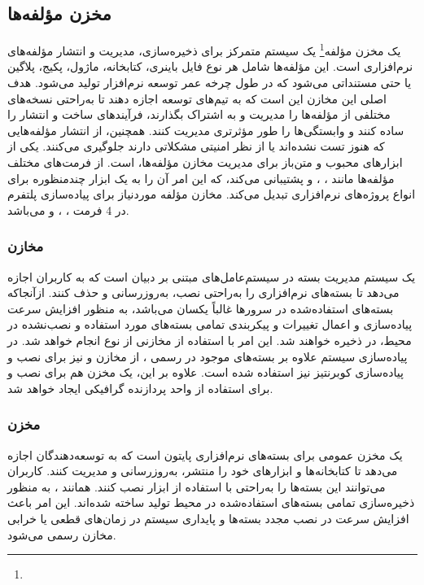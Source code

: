 \subsection{مخزن مؤلفه‌ها}
یک مخزن مؤلفه\footnote{} یک سیستم متمرکز برای ذخیره‌سازی، مدیریت و انتشار مؤلفه‌های نرم‌افزاری است. این مؤلفه‌ها شامل هر نوع فایل باینری، کتابخانه، ماژول، پکیج، پلاگین یا حتی مستنداتی می‌شود که در طول چرخه عمر توسعه نرم‌افزار تولید می‌شود. هدف اصلی این مخازن این است که به تیم‌های توسعه اجازه دهند تا به‌راحتی نسخه‌های مختلفی از مؤلفه‌ها را مدیریت و به اشتراک بگذارند، فرآیندهای ساخت و انتشار را ساده کنند و وابستگی‌ها را طور مؤثرتری مدیریت کنند. همچنین، از انتشار مؤلفه‌هایی که هنوز تست نشده‌اند یا از نظر امنیتی مشکلاتی دارند جلوگیری می‌کنند. 
یکی از ابزارهای محبوب و متن‌باز برای مدیریت مخازن مؤلفه‌ها،  است.  از فرمت‌های مختلف مؤلفه‌ها مانند ، ،  و  پشتیبانی می‌کند، که این امر آن را به یک ابزار چندمنظوره برای انواع پروژه‌های نرم‌افزاری تبدیل می‌کند. مخازن مؤلفه موردنیاز برای پیاده‌سازی پلتفرم در 4 فرمت ، ،  و  می‌باشد.

\subsubsection{مخازن }
یک سیستم مدیریت بسته در سیستم‌عامل‌های مبتنی بر دبیان است که به کاربران اجازه می‌دهد تا بسته‌های نرم‌افزاری را به‌راحتی نصب، به‌روزرسانی و حذف کنند. ازآنجاکه بسته‌های استفاده‌شده در سرورها غالباً یکسان می‌باشد، به منظور افزایش سرعت پیاده‌سازی و اعمال تغییرات و پیکربندی تمامی بسته‌های مورد استفاده و نصب‌نشده در محیط، در  ذخیره خواهند شد. این امر با استفاده از مخازنی از نوع  انجام خواهد شد. در پیاده‌سازی سیستم علاوه بر بسته‌های موجود در  رسمی ، از مخازن  و  نیز برای نصب و پیاده‌سازی کوبرنتیز نیز استفاده شده است. علاوه بر این، یک مخزن هم برای نصب  و  برای استفاده از واحد پردازنده گرافیکی ایجاد خواهد شد.
\subsubsection{مخزن }
یک مخزن عمومی برای بسته‌های نرم‌افزاری پایتون است که به توسعه‌دهندگان اجازه می‌دهد تا کتابخانه‌ها و ابزارهای خود را منتشر، به‌روزرسانی و مدیریت کنند. کاربران می‌توانند این بسته‌ها را به‌راحتی با استفاده از ابزار  نصب کنند. همانند ، به منظور ذخیره‌سازی تمامی بسته‌های استفاده‌شده در محیط تولید ساخته شده‌اند. این امر باعث افزایش سرعت در نصب مجدد بسته‌ها و پایداری سیستم در زمان‌های قطعی یا خرابی مخازن رسمی می‌شود.
